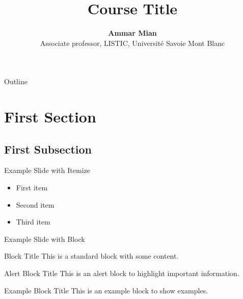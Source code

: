 \documentclass[aspectratio=1610]{beamer}
\title[Course Title]{Course Title}
\date[]{}
\author[AM]{\textbf{Ammar Mian} \\ \footnotesize Associate professor, LISTIC, Université Savoie Mont Blanc}
\begin{document}

\begin{frame}
\titlepage
\end{frame}

\begingroup
{}
\begin{frame}{Outline}
    \tableofcontents[]
\end{frame}
\endgroup




\section{First Section}

\subsection{First Subsection}

\begin{frame}{Example Slide with Itemize}
  \begin{itemize}
    \item First item
    \item Second item
    \item Third item
  \end{itemize}
\end{frame}

\begin{frame}{Example Slide with Block}
  \begin{block}{Block Title}
    This is a standard block with some content.
  \end{block}

  \begin{alertblock}{Alert Block Title}
    This is an alert block to highlight important information.
  \end{alertblock}

  \begin{exampleblock}{Example Block Title}
    This is an example block to show examples.
  \end{exampleblock}
\end{frame}
\end{document}
